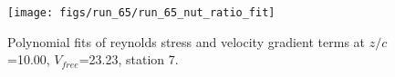 \begin{figure}[H]
\centering
\texttt{[image: figs/run\_65/run\_65\_nut\_ratio\_fit]}
\caption{Polynomial fits of reynolds stress and velocity gradient terms at $z/c$=10.00, $V_{free}$=23.23, station 7.}
\label{fig:run_65_nut_ratio_fit}
\end{figure}


